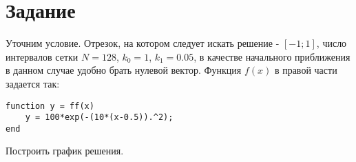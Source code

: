 \section{Задание}
Уточним условие. Отрезок, на котором следует искать решение - $[-1; 1]$, число интервалов сетки $N = 128$, $k_0 = 1$, $k_1 = 0.05$, в качестве начального приближения в данном случае удобно брать нулевой вектор. Функция $f(x)$ в правой части задается так:
\begin{matlablisting}
	\begin{lstlisting}
function y = ff(x)
    y = 100*exp(-(10*(x-0.5)).^2);
end
	\end{lstlisting}
\end{matlablisting}
Построить график решения.